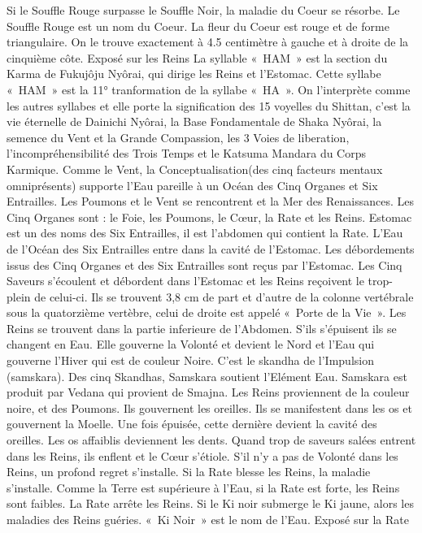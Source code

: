 Si le Souffle Rouge surpasse le Souffle Noir, la maladie du Coeur se résorbe. Le Souffle Rouge est un nom du Coeur. La fleur du Coeur est rouge et de forme triangulaire. On le trouve exactement à 4.5 centimètre à gauche et à droite de la cinquième côte.
Exposé sur les Reins
La syllable « HAM » est la section du Karma de Fukujôju Nyôrai, qui dirige les Reins et l'Estomac. Cette syllabe « HAM » est la 11° tranformation de la syllabe « HA ». On l’interprète comme les autres syllabes et elle porte la signification des 15 voyelles du Shittan, c’est la vie éternelle de Dainichi Nyôrai, la Base Fondamentale de Shaka Nyôrai, la semence du Vent et la Grande Compassion, les 3 Voies de liberation, l'incompréhensibilité des Trois Temps et le Katsuma Mandara du Corps Karmique.
Comme le Vent, la Conceptualisation(des cinq facteurs mentaux omniprésents) supporte l'Eau pareille à un Océan des Cinq Organes et Six Entrailles. Les Poumons et le Vent se rencontrent et la Mer des Renaissances.
Les Cinq Organes sont : le Foie, les Poumons, le Cœur, la Rate et les Reins. Estomac est un des noms des Six Entrailles, il est l’abdomen qui contient la Rate.
L’Eau de l’Océan des Six Entrailles entre dans la cavité de l’Estomac.  Les débordements issus des Cinq Organes et des Six Entrailles sont reçus par l'Estomac.
Les Cinq Saveurs s'écoulent et débordent dans l'Estomac et les Reins reçoivent le trop-plein de celui-ci. Ils se trouvent 3,8 cm de part et d'autre de la colonne vertébrale sous la quatorzième vertèbre,  celui de droite est appelé « Porte de la Vie ».
Les Reins se trouvent dans la partie inferieure de l'Abdomen. S’ils s'épuisent ils se changent en Eau. Elle gouverne la Volonté et devient le Nord et l’Eau qui gouverne l’Hiver qui est de couleur Noire. C'est le skandha de l’Impulsion (samskara).
Des cinq Skandhas, Samskara soutient l'Elément Eau. Samskara est produit par Vedana qui provient de Smajna.
  Les Reins proviennent de la couleur noire, et des Poumons. Ils gouvernent les oreilles. Ils se manifestent dans les os et gouvernent la Moelle. Une fois épuisée, cette dernière devient la cavité des oreilles. Les os affaiblis deviennent les dents.
Quand trop de saveurs salées entrent dans les Reins, ils enflent et  le Cœur s'étiole. S’il n’y a pas de Volonté dans les Reins, un profond regret s’installe. Si la Rate blesse les Reins, la maladie s'installe. Comme la Terre est supérieure à l’Eau, si la Rate est forte, les Reins sont faibles. La Rate arrête les Reins. Si le Ki noir submerge le Ki jaune, alors les maladies des Reins guéries. « Ki Noir » est le nom de l'Eau.
Exposé sur la Rate
